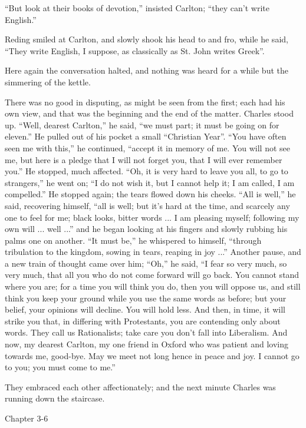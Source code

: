 ``But look at their books of devotion,'' insisted Carlton;
``they can't write English.''

Reding smiled at Carlton, and slowly shook his head to and fro,
while he said, ``They write English, I suppose, as classically as
St. John writes Greek''.

Here again the conversation halted, and nothing was heard for a
while but the simmering of the kettle.

There was no good in disputing, as might be seen from the first;
each had his own view, and that was the beginning and the end of the
matter. Charles stood up. ``Well, dearest Carlton,'' he
said, ``we must part; it must be going on for eleven.'' He
pulled out of his pocket a small ``Christian Year''. ``You
have often seen me with this,'' he continued, ``accept it in
memory of me. You will not see me, but here is a pledge that I will
not forget you, that I will ever remember you.'' He stopped, much
affected. ``Oh, it is very hard to leave you all, to go to
strangers,'' he went on; ``I do not wish it, but I cannot help
it; I am called, I am compelled.'' He stopped again; the tears
flowed down his cheeks. ``All is well,'' he said, recovering
himself, ``all is well; but it's hard at the time, and scarcely
any one to feel for me; black looks, bitter words ... I am pleasing
myself; following my own will ... well ...'' and he began looking
at his fingers and slowly rubbing his palms one on another. ``It
must be,'' he whispered to himself, ``through tribulation to
the kingdom, sowing in tears, reaping in joy ...'' Another pause,
and a new train of thought came over him; ``Oh,'' he said,
``I fear so very much, so very much, that all you who do not come
forward will go back. You cannot stand where you are; for a time you
will think you do, then you will oppose us, and still think you keep
your ground while you use the same words as before; but your belief,
your opinions will decline. You will hold less. And then, in time, it
will strike you that, in differing with Protestants, you are
contending only about words. They call us Rationalists; take care you
don't fall into Liberalism. And now, my dearest Carlton, my one friend
in Oxford who was patient and loving towards me, good-bye. May
we meet not long hence in peace and joy. I cannot go to you; you must
come to me.''

They embraced each other affectionately; and the next minute
Charles was running down the staircase.

Chapter 3-6


